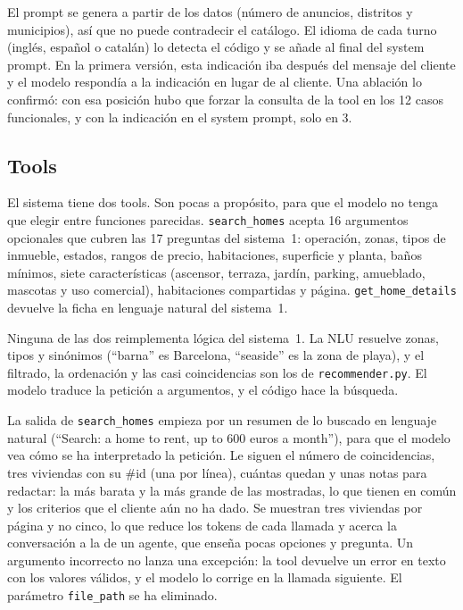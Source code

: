 \documentclass[10pt,a4paper]{article}
\begin{document}
El prompt se genera a partir de los datos (número de anuncios, distritos y municipios), así que no puede contradecir el catálogo. El idioma de cada turno (inglés, español o catalán) lo detecta el código y se añade al final del system prompt. En la primera versión, esta indicación iba después del mensaje del cliente y el modelo respondía a la indicación en lugar de al cliente. Una ablación lo confirmó: con esa posición hubo que forzar la consulta de la tool en los 12 casos funcionales, y con la indicación en el system prompt, solo en 3.

\subsection{Tools}

El sistema tiene dos tools. Son pocas a propósito, para que el modelo no tenga que elegir entre funciones parecidas. \texttt{search\_homes} acepta 16 argumentos opcionales que cubren las 17 preguntas del sistema~1: operación, zonas, tipos de inmueble, estados, rangos de precio, habitaciones, superficie y planta, baños mínimos, siete características (ascensor, terraza, jardín, parking, amueblado, mascotas y uso comercial), habitaciones compartidas y página. \texttt{get\_home\_details} devuelve la ficha en lenguaje natural del sistema~1.

Ninguna de las dos reimplementa lógica del sistema~1. La NLU resuelve zonas, tipos y sinónimos (``barna'' es Barcelona, ``seaside'' es la zona de playa), y el filtrado, la ordenación y las casi coincidencias son los de \texttt{recommender.py}. El modelo traduce la petición a argumentos, y el código hace la búsqueda.

La salida de \texttt{search\_homes} empieza por un resumen de lo buscado en lenguaje natural (``Search: a home to rent, up to 600 euros a month''), para que el modelo vea cómo se ha interpretado la petición. Le siguen el número de coincidencias, tres viviendas con su \#id (una por línea), cuántas quedan y unas notas para redactar: la más barata y la más grande de las mostradas, lo que tienen en común y los criterios que el cliente aún no ha dado. Se muestran tres viviendas por página y no cinco, lo que reduce los tokens de cada llamada y acerca la conversación a la de un agente, que enseña pocas opciones y pregunta. Un argumento incorrecto no lanza una excepción: la tool devuelve un error en texto con los valores válidos, y el modelo lo corrige en la llamada siguiente. El parámetro \texttt{file\_path} se ha eliminado.
\end{document}
